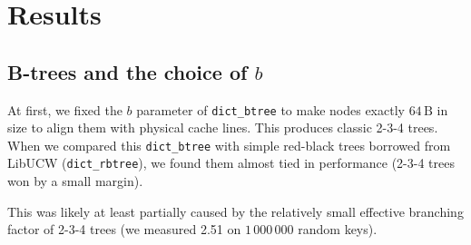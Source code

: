 \chapter{Results}
\label{chapter:results}

\section{\mbox{B-trees} and the choice of $b$}
\label{sec:btree-b-choice}
At first, we fixed the $b$ parameter of \texttt{dict\_btree} to make nodes
exactly $64\,\text{B}$ in size to align them with physical cache lines.
This produces classic 2-3-4 trees. When we compared this \texttt{dict\_btree}
with simple red-black trees borrowed from LibUCW (\texttt{dict\_rbtree}),
we found them almost tied in performance (2-3-4 trees won by a small margin).

This was likely at least partially caused by the relatively small effective
branching factor of 2-3-4 trees (we measured 2.51 on $1\,000\,000$ random
keys).

